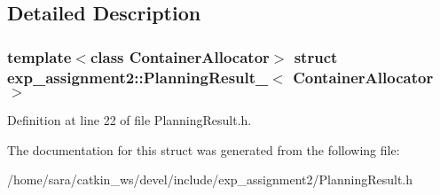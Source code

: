 \subsection{Detailed Description}
\subsubsection*{template$<$class Container\+Allocator$>$\newline
struct exp\+\_\+assignment2\+::\+Planning\+Result\+\_\+$<$ Container\+Allocator $>$}



Definition at line 22 of file Planning\+Result.\+h.



The documentation for this struct was generated from the following file\+:\begin{DoxyCompactItemize}
\item 
/home/sara/catkin\+\_\+ws/devel/include/exp\+\_\+assignment2/Planning\+Result.\+h\end{DoxyCompactItemize}
